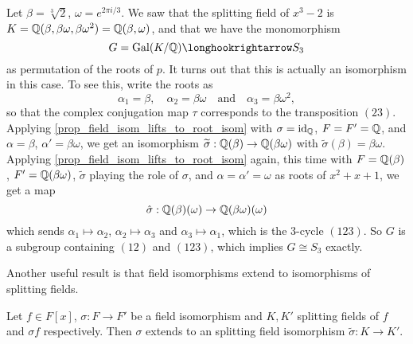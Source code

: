 \begin{example}
\label{exmp_gal_grp_of_cbrt_2}
    Let $\beta = \sqrt[3]{2}$, $\omega = e^{2\pi i/3}$. We saw that the splitting field of $x^3 - 2$ is $K = \mathbb{{Q}}(\beta, \beta \omega, \beta \omega^2) = \mathbb{{Q}}(\beta, \omega)$, and that we have the monomorphism
    \[
        G = \gal(K/\bb{Q}) \inclusion S_3
    \]
    as permutation of the roots of $p$. It turns out that this is actually an isomorphism in this case. To see this, write the roots as
    \[
        \alpha_1 = \beta,
        \quad
        \alpha_2 = \beta \omega
        \quad \text{and} \quad
        \alpha_3 = \beta \omega^2,
    \]
    so that the complex conjugation map $\tau$ corresponds to the transposition $(23)$. Applying \cref{prop_field_isom_lifts_to_root_isom} with $\sigma = \operatorname{id}_{\mathbb{{Q}}}$, $F = F' = \mathbb{{Q}}$, and $\alpha = \beta$, $\alpha' = \beta \omega$, we get an isomorphism $\widetilde{\sigma}: \mathbb{{Q}}(\beta) \to \mathbb{{Q}}(\beta \omega)$ with $\widetilde{\sigma}(\beta) = \beta \omega$. Applying \cref{prop_field_isom_lifts_to_root_isom} again, this time with $F = \mathbb{{Q}}(\beta)$, $F' = \mathbb{{Q}}(\beta \omega)$, $\widetilde{\sigma}$ playing the role of $\sigma$, and $\alpha = \alpha' = \omega$ as roots of $x^2 + x + 1$, we get a map
    \[
        \hat{\sigma} : \mathbb{{Q}}(\beta)(\omega) \to \mathbb{{Q}}(\beta \omega)(\omega)
    \]
    which sends $\alpha_1 \mapsto \alpha_2$, $\alpha_2 \mapsto \alpha_3$ and $\alpha_3 \mapsto \alpha_1$, which is the 3-cycle $(123)$. So $G$ is a subgroup containing $(12)$ and $(123)$, which implies $G \cong S_3$ exactly.
\end{example}

Another useful result is that field isomorphisms extend to isomorphisms of splitting fields.

\begin{proposition}
\label{prop_field_isom_ext_to_spl_field_isom}
    Let $f \in F[x]$, $\sigma: F \to F'$ be a field isomorphism and $K, K'$ splitting fields of $f$ and $\sigma f$ respectively. Then $\sigma$ extends to an splitting field isomorphism $\widetilde{\sigma}: K \to K'$.
\end{proposition}

